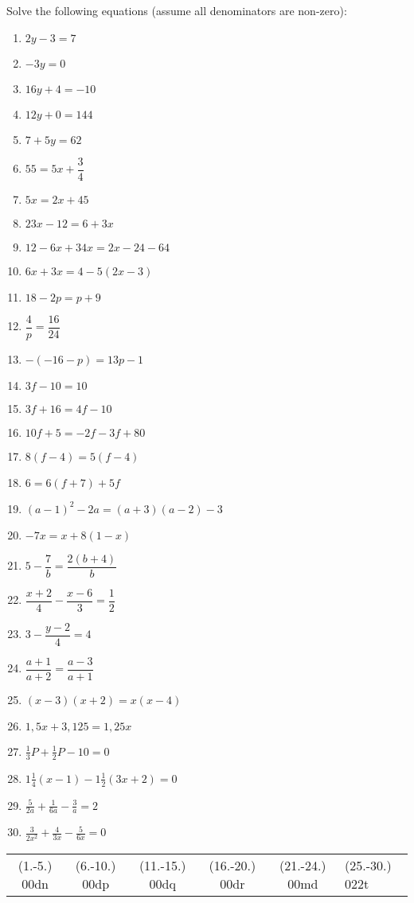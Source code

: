 \begin{exercises}{}
{Solve the following equations (assume all denominators are non-zero):

\begin{multicols}{2}
\begin{enumerate}[itemsep=6pt, label=\textbf{\arabic*}. ] 
\item   $2y-3=7$
\item   $-3y=0$        
\item   $16y+4=-10$        
\item   $12y+0=144$
\item   $7+5y=62$       
\item   $55=5x+\dfrac{3}{4}$ 
\item   $5x=2x+45$        
\item   $23x-12=6+3x$
\item   $12-6x+34x=2x-24-64$
\item   $6x+3x=4-5(2x-3)$
\item   $18-2p=p+9$   
\item   $\dfrac{4}{p}=\dfrac{16}{24}$
\item   $-(-16-p)=13p-1$
\item   $3f-10=10$
\item   $3f+16=4f-10$
\item   $10f+5=-2f-3f+80$
\item   $8(f-4)=5(f-4)$
\item  $6=6(f+7)+5f$      
\item \small{$(a-1)^{2} - 2a = (a+3)(a-2) - 3$}\normalsize
\item $-7x = x+8(1-x)$ 
\item $5-\dfrac{7}{b} = \dfrac{2(b+4)}{b}$
\item $\dfrac{x+2}{4} - \dfrac{x-6}{3} = \dfrac{1}{2}$
\item $ 3 - \dfrac{y-2}{4} = 4$
\item $ \dfrac{a+1}{a+2} = \dfrac{a-3}{a+1}$
\item $(x-3)(x+2)=x(x-4)$
\item $1,5x+3,125=1,25x$
\item $\frac{1}{3}P + \frac{1}{2}P - 10 = 0$
\item $1 \frac{1}{4} (x-1)-1\frac{1}{2}(3x+2)=0$
\item $\frac{5}{2a}+\frac{1}{6a}-\frac{3}{a}=2$
\item $\frac{3}{2x^2}+\frac{4}{3x}-\frac{5}{6x}=0$  
\end{enumerate}
\end{multicols}
\practiceinfo
\par 
\par \begin{tabular}[h]{ccccc}
(1.-5.) 00dn&  (6.-10.) 00dp&  (11.-15.) 00dq&  (16.-20.) 00dr& (21.-24.) 00md & (25.-30.) 022t & \end{tabular}
}
\end{exercises}

